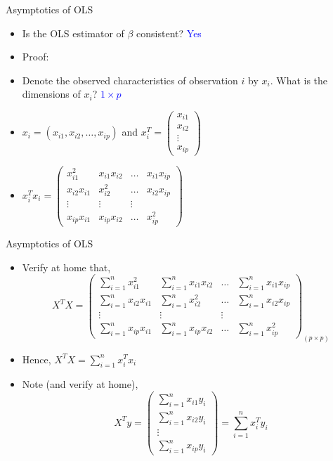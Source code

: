 \documentclass[handout]{beamer}
\begin{document}
\begin{frame}{Asymptotics of OLS }
\begin{itemize}
\item Is the OLS estimator of $\beta$ consistent? \pause \textcolor{blue}{Yes}
\item Proof:
\item Denote the observed characteristics of observation $i$ by $x_i$. What is the dimensions of $x_i$?
\pause \textcolor{blue}{$1 \times p$}   
\item $x_i = (x_{i1},x_{i2},\dots,x_{ip})$ and 
$ x_i^T = \left(  \begin{array}{c}
x_{i1} \\
x_{i2} \\
\vdots \\
x_{ip}
\end{array} \right)$
\pause
\item  
 $ x_i^T x_i = \left(
\begin{array}{cccc}
x_{i1}^2 & x_{i1}x_{i2} & \dots & x_{i1} x_{ip} \\
x_{i2} x_{i1} & x_{i2}^2 & \dots & x_{i2} x_{ip} \\
\vdots & \vdots & \vdots &  \\
x_{ip} x_{i1} & x_{ip} x_{i2} & \dots & x_{ip}^2 
\end{array} \right)
$
\end{itemize}
\end{frame}


\begin{frame}{Asymptotics of OLS }
\begin{itemize}
\item Verify at home that, 
 \[ X^T X = \left(
\begin{array}{cccc}
\sum_{i=1}^n x_{i1}^2 & \sum_{i=1}^n x_{i1}x_{i2} & \dots & \sum_{i=1}^n x_{i1} x_{ip} \\
\sum_{i=1}^n x_{i2} x_{i1} & \sum_{i=1}^n x_{i2}^2 & \dots & \sum_{i=1}^n x_{i2} x_{ip} \\
\vdots & \vdots & \vdots &  \\
\sum_{i=1}^n x_{ip} x_{i1} & \sum_{i=1}^n x_{ip} x_{i2} & \dots & \sum_{i=1}^n x_{ip}^2 
\end{array} \right)_{(p \times p)}
\]
\pause
\item Hence, $X^T X = \sum_{i=1}^n x_{i}^T x_{i}$
\item Note (and verify at home), 
\[ X^T y = 
\left( \begin{array}{c}
\sum_{i=1}^n x_{i1} y_i  \\
\sum_{i=1}^n x_{i2} y_i  \\
\vdots  \\
\sum_{i=1}^n x_{ip} y_i
\end{array} \right) 
= \sum_{i=1}^n x_i^T y_i \]
\end{itemize}
\end{frame}
\end{document}
